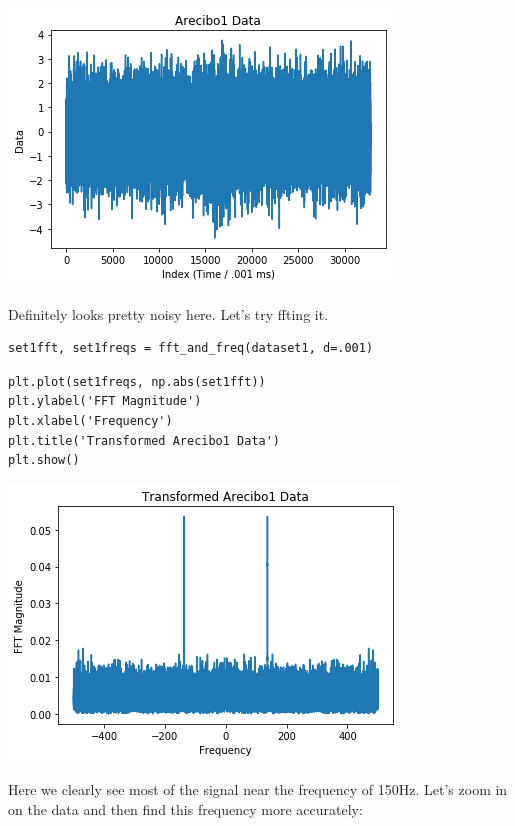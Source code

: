 \documentclass[11pt]{article}
\begin{document}
\includegraphics[width=.9\linewidth]{./obipy-resources/17087JHe.png}

Definitely looks pretty noisy here. Let's try ffting it.


\begin{verbatim}
set1fft, set1freqs = fft_and_freq(dataset1, d=.001)
\end{verbatim}


\begin{verbatim}
plt.plot(set1freqs, np.abs(set1fft))
plt.ylabel('FFT Magnitude')
plt.xlabel('Frequency')
plt.title('Transformed Arecibo1 Data')
plt.show()
\end{verbatim}

\includegraphics[width=.9\linewidth]{./obipy-resources/17087WRk.png}

Here we clearly see most of the signal near the frequency of 150Hz. Let's zoom
in on the data and then find this frequency more accurately:
\end{document}
